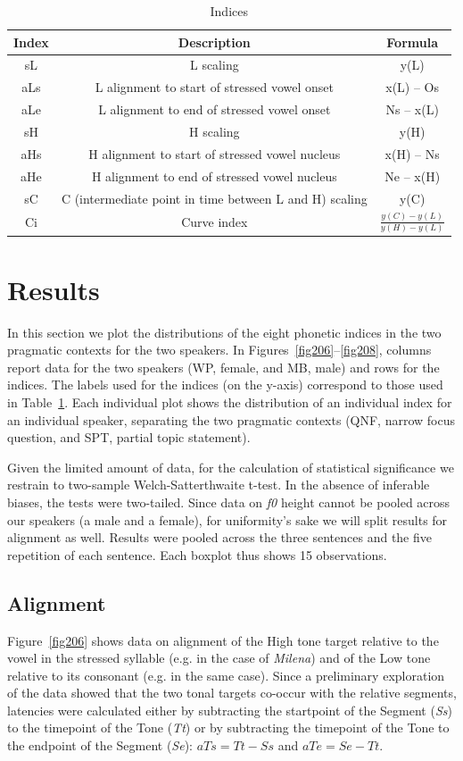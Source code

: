 \begin{table}[h]
\centering
\resizebox{\linewidth}{!} {
\begin{tabular}{c c c}
\mytoprule
Index & Description & Formula \\
\midrule
sL & L scaling & y(L) \\
aLs	& L alignment to start of stressed vowel onset & x(L) – Os \\
aLe	& L alignment to end of stressed vowel onset & Ns – x(L) \\
sH	& H scaling	& y(H) \\
aHs	& H alignment to start of stressed vowel nucleus & x(H) – Ns \\
aHe	& H alignment to end of stressed vowel nucleus & Ne – x(H) \\
sC	& C (intermediate point in time between L and H) scaling & y(C) \\
Ci	& Curve index & \(\frac{y(C)-y(L)}{y(H)-y(L)}\) \\
\end{tabular}
}
\caption{Indices}
\label{tab21}\end{table}

\section{Results}\label{sec23}
In this section we plot the distributions of the eight phonetic indices in the two pragmatic contexts for the two speakers. In Figures~\ref{fig206}--\ref{fig208}, columns report data for the two speakers (WP, female, and MB, male) and rows for the indices. The labels used for the indices (on the y-axis) correspond to those used in Table~\ref{tab21}. Each individual plot shows the distribution of an individual index for an individual speaker, separating the two pragmatic contexts (QNF, narrow focus question, and SPT, partial topic statement).

Given the limited amount of data, for the calculation of statistical significance we restrain to two-sample Welch-Satterthwaite t-test. In the absence of inferable biases, the tests were two-tailed. Since data on \textit{f0} height cannot be pooled across our speakers (a male and a female), for uniformity's sake we will split results for alignment as well. Results were pooled across the three sentences and the five repetition of each sentence. Each boxplot thus shows 15 observations.

\subsection{Alignment}\label{sec231}
Figure~\ref{fig206} shows data on alignment of the High tone target relative to the vowel in the stressed syllable (e.g. \textipa{[E]} in the case of \textit{Milena}) and of the Low tone relative to its consonant (e.g. \textipa{[l]} in the same case). Since a preliminary exploration of the data showed that the two tonal targets co-occur with the relative segments, latencies were calculated either by subtracting the startpoint of the Segment (\textit{Ss}) to the timepoint of the Tone (\textit{Tt}) or by subtracting the timepoint of the Tone to the endpoint of the Segment (\textit{Se}): $ aTs = Tt - Ss $ and $ aTe = Se - Tt $. 

